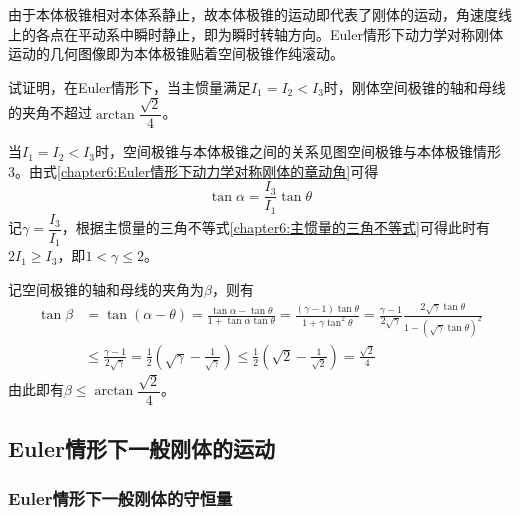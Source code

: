 由于本体极锥相对本体系静止，故本体极锥的运动即代表了刚体的运动，角速度线上的各点在平动系中瞬时静止，即为瞬时转轴方向。Euler情形下动力学对称刚体运动的几何图像即为本体极锥贴着空间极锥作纯滚动。

\begin{example}
试证明，在Euler情形下，当主惯量满足$I_1=I_2<I_3$时，刚体空间极锥的轴和母线的夹角不超过$\arctan\dfrac{\sqrt{2}}{4}$。
\end{example}
\begin{solution}
当$I_1=I_2<I_3$时，空间极锥与本体极锥之间的关系见图{空间极锥与本体极锥情形3}。由式\eqref{chapter6:Euler情形下动力学对称刚体的章动角}可得
\begin{equation*}
	\tan\alpha=\frac{I_3}{I_1}\tan\theta
\end{equation*}
记$\gamma=\dfrac{I_3}{I_1}$，根据主惯量的三角不等式\eqref{chapter6:主惯量的三角不等式}可得此时有$2I_1\geqslant I_3$，即$1<\gamma\leqslant 2$。

记空间极锥的轴和母线的夹角为$\beta$，则有
\begin{align*}
	\tan\beta & = \tan(\alpha-\theta) = \frac{\tan\alpha-\tan\theta}{1+\tan\alpha\tan\theta} = \frac{(\gamma-1)\tan\theta}{1+\gamma\tan^2\theta} = \frac{\gamma-1}{2\sqrt{\gamma}}\frac{2\sqrt{\gamma}\tan\theta}{1-(\sqrt{\gamma}\tan\theta)^2} \\
	& \leqslant \frac{\gamma-1}{2\sqrt{\gamma}} = \frac12 \left(\sqrt{\gamma}-\frac{1}{\sqrt{\gamma}}\right) \leqslant \frac12 \left(\sqrt{2}-\frac{1}{\sqrt{2}}\right) = \frac{\sqrt{2}}{4}
\end{align*}
由此即有$\beta\leqslant \arctan\dfrac{\sqrt{2}}{4}$。
\end{solution}

\subsection{Euler情形下一般刚体的运动}

\subsubsection{Euler情形下一般刚体的守恒量}


